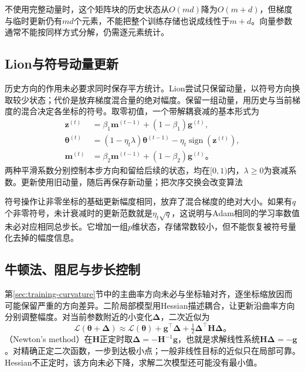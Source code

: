 不使用完整动量时，这个矩阵块的历史状态从$O(md)$降为$O(m+d)$，但梯度与临时更新仍有$md$个元素，不能把整个训练存储也说成线性于$m+d$。向量参数通常不能按同样方式分解，仍需逐元素统计。

\subsection{Lion与符号动量更新}
\label{sec:training-lion}

历史方向的作用未必要求同时保存平方统计。Lion尝试只保留动量，以符号方向换取较少状态；代价是放弃梯度混合量的绝对幅度。保留一组动量，用历史与当前梯度的混合决定各坐标的符号。取零初值，一个带解耦衰减的基本形式为
\begin{align}
  \bm z^{(t)}&=\beta_1\bm m^{(t-1)}+(1-\beta_1)\bm g^{(t)},\\
  \bm\theta^{(t)}&=(1-\eta_t\lambda)\bm\theta^{(t-1)}
      -\eta_t\operatorname{sign}(\bm z^{(t)}),\\
  \bm m^{(t)}&=\beta_2\bm m^{(t-1)}+(1-\beta_2)\bm g^{(t)}\text{。}
  \label{eq:training-lion}
\end{align}
两种平滑系数分别控制本步方向和留给后续的状态，均在$[0,1)$内，$\lambda\geq0$为衰减系数。更新使用旧动量，随后再保存新动量；把次序交换会改变算法

符号操作让非零坐标的基础更新幅度相同，放弃了混合梯度的绝对大小。如果有$q$个非零符号，未计衰减时的更新范数就是$\eta_t\sqrt q$，这说明与Adam相同的学习率数值未必对应相同总步长。它增加一组$p$维状态，存储常数较小，但不能恢复被符号量化去掉的幅度信息。

\subsection{牛顿法、阻尼与步长控制}
\label{sec:training-second-order}

第\ref{sec:training-curvature}节中的主曲率方向未必与坐标轴对齐，逐坐标缩放因而可能保留严重的方向差异。二阶局部模型用Hessian描述耦合，让更新沿曲率方向分别调整幅度。对当前参数附近的小变化$\bm\Delta$，二次近似为
\begin{equation}
  \mathcal L(\bm\theta+\bm\Delta)
  \approx\mathcal L(\bm\theta)+\bm g^{\top}\bm\Delta
               +\tfrac12\bm\Delta^{\top}\bm H\bm\Delta\text{。}
  \label{eq:training-local-quadratic}
\end{equation}
（Newton's method）在$\bm H$正定时取$\bm\Delta=-\bm H^{-1}\bm g$，也就是求解线性系统$\bm H\bm\Delta=-\bm g$。对精确正定二次函数，一步到达极小点；一般非线性目标的近似只在局部可靠。Hessian不正定时，该方向未必下降，求解二次模型还可能没有最小值。

